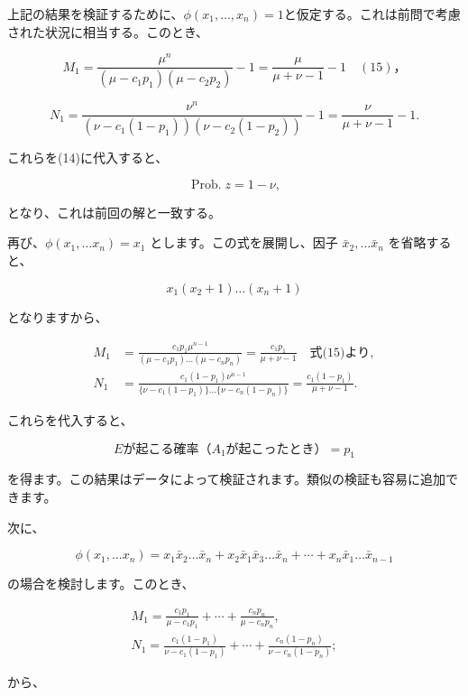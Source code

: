 \documentclass[a4paper,11pt,openany]{ltjsbook}
\begin{document}
上記の結果を検証するために、$\phi(x_1, \dotsc, x_n) = 1$と仮定する。これは前問で考慮された状況に相当する。このとき、

\[
  M_1 = \frac{\mu^n}{(\mu - c_1 p_1)(\mu - c_2 p_2)} - 1
= \frac{\mu}{\mu + \nu - 1} - 1 \quad (15)，
\]

\[
  N_1 
= \frac{\nu^n}{(\nu - c_1(1 - p_1))(\nu - c_2(1 - p_2))} - 1
= \frac{\nu}{\mu + \nu - 1} - 1.
\]

これらを(14)に代入すると、

\[
  \operatorname{Prob. } z = 1 - \nu,
\]

となり、これは前回の解と一致する。

再び、$\phi(x_1, \dotsc x_n) = x_1$ とします。この式を展開し、因子 $\bar{x}_2, \dotsc \bar{x}_n$ を省略すると、

$$x_1 (x_2 + 1)\dotsc (x_n+1)$$

となりますから、

\begin{align*}
M_1 &= \frac{c_1 p_1 \mu^{n-1}}{(\mu-c_1 p_1)\dotsc (\mu-c_n p_n)} = \frac{c_1 p_1}{\mu + \nu - 1} \quad \text{式(15)より}, \\
N_1 &= \frac{c_1 (1-p_1)\nu^{n-1}}{\{\nu - c_1(1-p_1)\}\dotsc \{\nu - c_n(1-p_n)\}} = \frac{c_1(1-p_1)}{\mu + \nu - 1}.
\end{align*}

これらを代入すると、

\begin{equation*}
Eが起こる確率（A_1が起こったとき） = p_1
\end{equation*}

を得ます。この結果はデータによって検証されます。類似の検証も容易に追加できます。

次に、

\begin{equation*}
\phi(x_1, \dotsc x_n) = x_1 \bar{x}_2 \dotsc \bar{x}_n + x_2 \bar{x}_1 \bar{x}_3 \dotsc \bar{x}_n + \dotsb + x_n \bar{x}_1 \dotsc \bar{x}_{n-1}
\end{equation*}

の場合を検討します。このとき、

\begin{gather*}
M_1 = \frac{c_1 p_1}{\mu - c_1 p_1} + \dotsb + \frac{c_n p_n}{\mu - c_n p_n}, \\
N_1 = \frac{c_1 (1-p_1)}{\nu - c_1(1-p_1)} + \dotsb + \frac{c_n (1-p_n)}{\nu - c_n(1-p_n)};
\end{gather*}

から、
\end{document}
